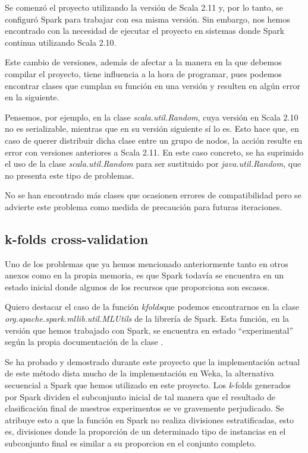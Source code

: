 Se comenzó el proyecto utilizando la versión de Scala 2.11 y, por lo tanto, se configuró Spark para trabajar con esa misma versión. Sin embargo, nos hemos encontrado con la necesidad de ejecutar el proyecto en sistemas donde Spark continua utilizando Scala 2.10.

Este cambio de versiones, además de afectar a la manera en la que debemos compilar el proyecto, tiene influencia a la hora de programar, pues podemos encontrar clases que cumplan su función en una versión y resulten en algún error en la siguiente. 

Pensemos, por ejemplo, en la clase \textit{scala.util.Random}, cuya versión en Scala 2.10 no es serializable, mientras que en su versión siguiente sí lo es. Esto hace que, en caso de querer distribuir dicha clase entre un grupo de nodos, la acción resulte en error con versiones anteriores a Scala 2.11. En este caso concreto, se ha suprimido el uso de la clase \textit{scala.util.Random} para ser sustituido por \textit{java.util.Random}, que no presenta este tipo de problemas.

No se han encontrado más clases que ocasionen errores de compatibilidad pero se advierte este problema como medida de precaución para futuras iteraciones.


\subsection{k-folds cross-validation}

Uno de los problemas que ya hemos mencionado anteriormente tanto en otros anexos como en la propia memoria, es que Spark todavía se encuentra en un estado inicial donde algunos de los recursos que proporciona son escasos.

Quiero destacar el caso de la función \textit{kfolds}que podemos encontrarnos en la clase \textit{org.apache.spark.mllib.util.MLUtils} de la librería de Spark. Esta función, en la versión que hemos trabajado con Spark, se encuentra en estado ``experimental'' según la propia documentación de la clase \cite{SparkMLUtils}.

Se ha probado y demostrado durante este proyecto que la implementación actual de este método dista mucho de la implementación en Weka, la alternativa secuencial a Spark que hemos utilizado en este proyecto. Los \textit{k}-folds generados por Spark dividen el subconjunto inicial de tal manera que el resultado de clasificación final de nuestros experimentos se ve gravemente perjudicado. Se atribuye esto a que la función en Spark no realiza divisiones estratificadas, esto es, divisiones donde la proporción de un determinado tipo de instancias en el subconjunto final es similar a su proporcion en el conjunto completo.

